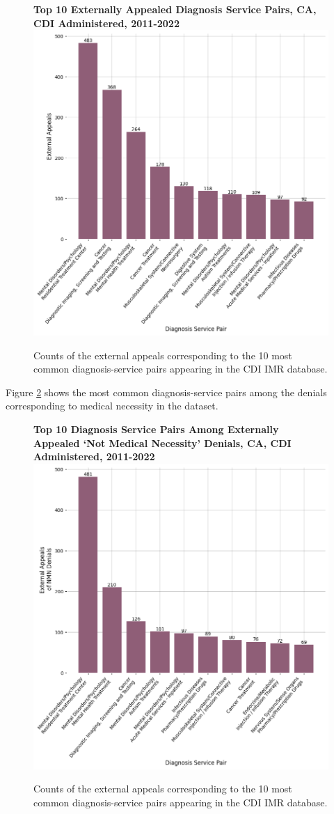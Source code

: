 \documentclass[12pt, a4paper,twoside]{report}
\theoremstyle{plain} %
\theoremstyle{definition} %
\theoremstyle{remark} %
\numberwithin{equation}{chapter}
\begin{document}
		\begin{figure}[h!]
			\centering
			\textbf{Top 10 Externally Appealed Diagnosis Service Pairs, CA, CDI Administered, 2011-2022}
			\includegraphics[width=.8\textwidth]{images/ca_doi_external_appeals/top_appealed_diag_services.png}
			\caption{Counts of the external appeals corresponding to the 10 most common diagnosis-service pairs appearing in the CDI IMR database.}
			\label{cacdiexternalappealsbydiagservice}
		\end{figure}
	
		Figure \ref{cacdinmnexternalappealdiagservice} shows the most common diagnosis-service pairs among the denials corresponding to medical necessity in the dataset.

		\begin{figure}[h!]
			\centering
			\textbf{Top 10 Diagnosis Service Pairs Among Externally Appealed `Not Medical Necessity' Denials, CA, CDI Administered, 2011-2022}
			\includegraphics[width=.8\textwidth]{images/ca_doi_external_appeals/top_nmn_appeal_diag_service.png}
			\caption{Counts of the external appeals corresponding to the 10 most common diagnosis-service pairs appearing in the CDI IMR database.}
			\label{cacdinmnexternalappealdiagservice}
		\end{figure}
	
\end{document}
